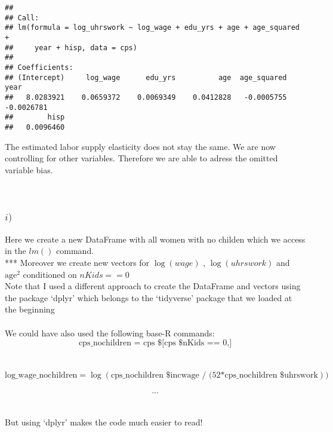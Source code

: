 \documentclass[
]{article}
\begin{document}
\begin{verbatim}
## 
## Call:
## lm(formula = log_uhrswork ~ log_wage + edu_yrs + age + age_squared + 
##     year + hisp, data = cps)
## 
## Coefficients:
## (Intercept)     log_wage      edu_yrs          age  age_squared         year  
##   8.0283921    0.0659372    0.0069349    0.0412828   -0.0005755   -0.0026781  
##        hisp  
##   0.0096460
\end{verbatim}

\hfill\break
The estimated labor supply elasticity does not stay the same. We are now
controlling for other variables. Therefore we are able to adress the
omitted variable bias.\\
~\\
~\\

\hypertarget{i}{%
\subsubsection{\texorpdfstring{\(i)\)}{i)}}\label{i}}

\hfill\break
Here we create a new DataFrame with all women with no childen which we
access in the \(lm()\) command.\\
*** Moreover we create new vectors for \(\log(wage)\) ,
\(\log(uhrswork)\) and \(\textrm{age}^2\) conditioned on
\(nKids == 0\)\\
Note that I used a different approach to create the DataFrame and
vectors using the package `dplyr' which belongs to the `tidyverse'
package that we loaded at the beginning\\
~\\
We could have also used the following base-R commands:\\
\[\textrm{cps_nochildren = cps \$ [cps \$ nKids == 0,]}\]\\
~\\
\[\textrm{log_wage_nochildren} = \log(\textrm{cps_nochildren \$ incwage / (52*cps_nochildren \$ uhrswork}))\]\\
\[...\]\\
~\\
But using `dplyr' makes the code much easier to read!\\
\end{document}
